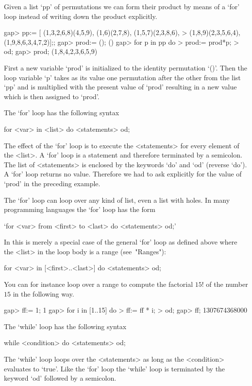 Given a list `pp' of permutations we can form their product by means of a
`for' loop instead of writing down the product explicitly.

\beginexample
gap> pp:= [ (1,3,2,6,8)(4,5,9), (1,6)(2,7,8), (1,5,7)(2,3,8,6),
>           (1,8,9)(2,3,5,6,4), (1,9,8,6,3,4,7,2)];;
gap> prod:= ();        
()
gap> for p in pp do
>       prod:= prod*p;    
>    od;
gap> prod;        
(1,8,4,2,3,6,5,9)
\endexample

First a  new variable `prod'  is initialized  to the identity permutation
`()'. Then the loop variable `p' takes as its value one permutation after
the other from the list `pp' and is multiplied with  the present value of
`prod'  resulting in a  new value which  is then assigned  to `prod'.

The `for' loop has the following syntax

\)\fmark for <var> in <list> do <statements> od;

The  effect of the `for'  loop  is to execute the <statements> for  every
element  of  the <list>.   A `for'  loop  is  a  statement  and therefore
terminated by a semicolon.  The list of <statements>  is enclosed by  the
keywords `do' and `od'  (reverse  `do').  A `for'  loop returns no value.
Therefore we had to ask explicitly for the value of `prod' in the
preceding example.

The `for' loop can loop over any kind of list, even a list with holes.
In many programming languages the `for' loop has the form

`for <var> from <first> to <last> do <statements> od;'

In {\GAP} this is merely a special case of the general `for' loop as defined
above where the <list> in the loop body is a range (see~"Ranges"):

\)\fmark for <var> in [<first>..<last>] do <statements>  od;

You can for  instance loop over a range to compute the factorial $15!$
of the number $15$ in the following way.

\beginexample
gap> ff:= 1;
1
gap> for i in [1..15] do
>       ff:= ff * i;
>    od;
gap> ff;
1307674368000
\endexample

The  `while' loop has the following syntax

\)\fmark while <condition> do <statements>  od; 

The `while'  loop loops over the <statements>  as long as  the 
<condition> evaluates  to  `true'. Like the `for' loop the `while' loop 
is terminated by the keyword `od' followed by a semicolon.

